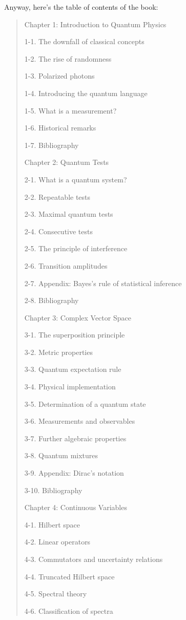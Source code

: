 \documentclass[12pt]{article}
\begin{document}
Anyway, here's the table of contents of the book:

\begin{quote}
{\rm
Chapter 1: Introduction to Quantum Physics

1-1. The downfall of classical concepts 

1-2. The rise of randomness 

1-3. Polarized photons 

1-4. Introducing the quantum language 

1-5. What is a measurement? 

1-6. Historical remarks 

1-7. Bibliography 

Chapter 2: Quantum Tests

2-1. What is a quantum system? 

2-2. Repeatable tests 

2-3. Maximal quantum tests 

2-4. Consecutive tests 

2-5. The principle of interference 

2-6. Transition amplitudes 

2-7. Appendix: Bayes's rule of statistical inference 

2-8. Bibliography 

Chapter 3: Complex Vector Space

3-1. The superposition principle 

3-2. Metric properties 

3-3. Quantum expectation rule 

3-4. Physical implementation 

3-5. Determination of a quantum state 

3-6. Measurements and observables 

3-7. Further algebraic properties 

3-8. Quantum mixtures 

3-9. Appendix: Dirac's notation 

3-10. Bibliography 

Chapter 4: Continuous Variables

4-1. Hilbert space 

4-2. Linear operators 

4-3. Commutators and uncertainty relations 

4-4. Truncated Hilbert space 

4-5. Spectral theory 

4-6. Classification of spectra 

}
\end{quote}
\end{document}
